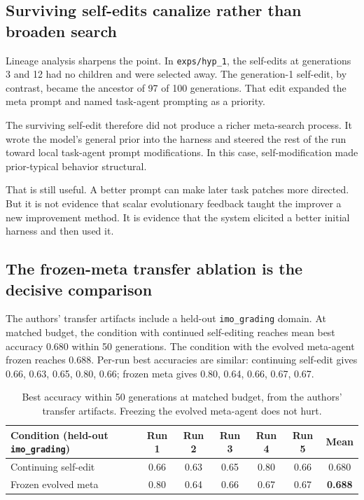 \documentclass[11pt]{article}
\begin{document}
\subsection{Surviving self-edits canalize rather than broaden search}\label{surviving-self-edits-canalize-rather-than-broaden-search}

Lineage analysis sharpens the point. In \texttt{exps/hyp\_1}, the self-edits at generations 3 and 12 had no children and were selected away. The generation-1 self-edit, by contrast, became the ancestor of 97 of 100 generations. That edit expanded the meta prompt and named task-agent prompting as a priority.

The surviving self-edit therefore did not produce a richer meta-search process. It wrote the model's general prior into the harness and steered the rest of the run toward local task-agent prompt modifications. In this case, self-modification made prior-typical behavior structural.

That is still useful. A better prompt can make later task patches more directed. But it is not evidence that scalar evolutionary feedback taught the improver a new improvement method. It is evidence that the system elicited a better initial harness and then used it.

\subsection{The frozen-meta transfer ablation is the decisive comparison}\label{the-frozen-meta-transfer-ablation-is-the-decisive-comparison}

The authors' transfer artifacts include a held-out \texttt{imo\_grading} domain. At matched budget, the condition with continued self-editing reaches mean best accuracy 0.680 within 50 generations. The condition with the evolved meta-agent frozen reaches 0.688. Per-run best accuracies are similar: continuing self-edit gives 0.66, 0.63, 0.65, 0.80, 0.66; frozen meta gives 0.80, 0.64, 0.66, 0.67, 0.67.

\begin{table}[h]
\centering
\small
\begin{tabular}{lcccccc}
\toprule
Condition (held-out \texttt{imo\_grading}) & Run 1 & Run 2 & Run 3 & Run 4 & Run 5 & Mean \\
\midrule
Continuing self-edit & 0.66 & 0.63 & 0.65 & 0.80 & 0.66 & 0.680 \\
Frozen evolved meta  & 0.80 & 0.64 & 0.66 & 0.67 & 0.67 & \textbf{0.688} \\
\bottomrule
\end{tabular}
\caption{Best accuracy within 50 generations at matched budget, from the authors' transfer artifacts. Freezing the evolved meta-agent does not hurt.}
\label{tab:transfer}
\end{table}
\end{document}
